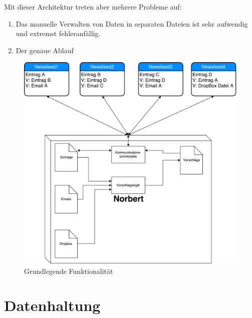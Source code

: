   	Mit dieser Architektur treten aber mehrere Probleme auf:
  	\begin{enumerate}
  	\item Das manuelle Verwalten von Daten in separaten Dateien ist sehr aufwendig und extremst fehleranfällig.
  	\item Der genaue Ablauf 
  	\end{enumerate}
\begin{figure}[H]
\centering
\includegraphics[scale=0.6]{uml-diagramms/overview_hlvl.pdf}
\caption{Grundlegende Funktionalität}
\label{fig: Overview_HLVL}
\end{figure}

\section{Datenhaltung}

